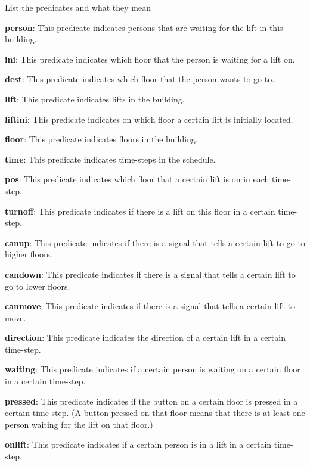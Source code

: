 \documentclass{article}
\begin{document}
\begin{Question}[Overview]
\begin{Subquestion}
\label{q:list-predicate}
List the predicates and what they mean
\begin{answer}
\item \textbf{person}: This predicate indicates persons that are waiting for the lift in this building. 
\item \textbf{ini}: This predicate indicates which floor that the person is waiting for a lift on. 
\item \textbf{dest}: This predicate indicates which floor that the person wants to go to.
\item \textbf{lift}: This predicate indicates lifts in the building. 
\item \textbf{liftini}: This predicate indicates on which floor a certain lift is initially located.
\item \textbf{floor}: This predicate indicates floors in the building. 
\item \textbf{time}: This predicate indicates time-steps in the schedule. 
\item \textbf{pos}: This predicate indicates which floor that a certain lift is on in each time-step.
\item \textbf{turnoff}: This predicate indicates if there is a lift on this floor in a certain time-step. 
\item \textbf{canup}: This predicate indicates if there is a signal that tells a certain lift to go to higher floors. 
\item \textbf{candown}: This predicate indicates if there is a signal that tells a certain lift to go to lower floors. 
\item \textbf{canmove}: This predicate indicates if there is a signal that tells a certain lift to move. 
\item \textbf{direction}: This predicate indicates the direction of a certain lift in a certain time-step. 
\item \textbf{waiting}: This predicate indicates if a certain person is waiting on a certain floor in a certain time-step. 
\item \textbf{pressed}: This predicate indicates if the button on a certain floor is pressed in a certain time-step. (A button pressed on that floor means that there is at least one person waiting for the lift on that floor.)
\item \textbf{onlift}: This predicate indicates if a certain person is in a lift in a certain time-step. 

\end{answer}
\end{Subquestion}
\end{Question}
\end{document}
